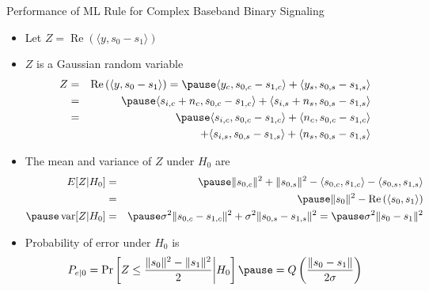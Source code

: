\documentclass[t]{beamer}
\newcommand{\var}{\operatornamewithlimits{var}}
\renewcommand\Re{\operatorname{Re}}
\begin{document}
\begin{frame}{Performance of ML Rule for Complex Baseband Binary Signaling}
  \footnotesize
  \begin{itemize}
    \item \pause Let $Z = \Re\left(\langle y, s_0 - s_1 \rangle\right)$
    \item \pause $Z$ is a Gaussian random variable \pause
      \begin{eqnarray*}
        Z & = & \Re\left(\langle y, s_0 - s_1 \rangle\right) = \pause \langle y_c, s_{0,c} - s_{1,c} \rangle + \langle y_s, s_{0,s} - s_{1,s} \rangle \\
          & = & \pause \langle s_{i,c} + n_c, s_{0,c} - s_{1,c} \rangle + \langle s_{i,s} + n_s, s_{0,s} - s_{1,s} \rangle \\
          & = & \pause \langle s_{i,c}, s_{0,c} - s_{1,c} \rangle + \langle n_c, s_{0,c} - s_{1,c} \rangle \\
          &   & + \langle s_{i,s}, s_{0,s} - s_{1,s} \rangle + \langle n_s, s_{0,s} - s_{1,s} \rangle
      \end{eqnarray*}
    \item \pause The mean and variance of $Z$ under $H_0$ are
      \begin{eqnarray*}
        E[Z|H_0] & = & \pause \lVert s_{0,c} \rVert^2 + \lVert s_{0,s} \rVert^2  - \langle s_{0,c},s_{1,c} \rangle - \langle s_{0,s},s_{1,s} \rangle \\
                 & = & \pause \lVert s_0 \rVert^2 - \Re\left(\langle s_0,s_1 \rangle\right) \\ \pause
     \var[Z|H_0] & = & \pause \sigma^2\lVert s_{0,c} - s_{1,c}\rVert^2 + \sigma^2\lVert s_{0,s} - s_{1,s}\rVert^2 = \pause \sigma^2\lVert s_0 - s_1\rVert^2
      \end{eqnarray*}
    \item \pause Probability of error under $H_0$ is
      \begin{eqnarray*}
        P_{e|0} = \Pr\left[ Z \leq  \frac{\lVert s_0 \rVert^2 -\lVert s_1 \rVert^2}{2} \bigg| H_0\right] \pause = Q\left(\frac{\lVert s_0 - s_1 \rVert}{2\sigma} \right) 
      \end{eqnarray*}
  \end{itemize}
  \normalsize
\end{frame}
\end{document}
